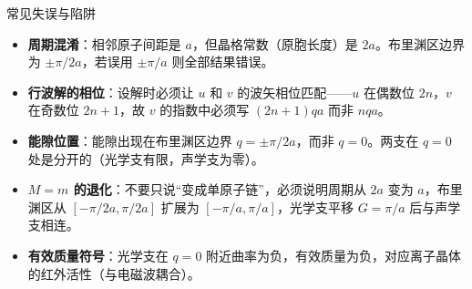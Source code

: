 \begin{errorbox}{常见失误与陷阱}
\begin{itemize}
    \item \textbf{周期混淆}：相邻原子间距是 $a$，但晶格常数（原胞长度）是 $2a$。布里渊区边界为 $\pm\pi/2a$，若误用 $\pm\pi/a$ 则全部结果错误。
    \item \textbf{行波解的相位}：设解时必须让 $u$ 和 $v$ 的波矢相位匹配——$u$ 在偶数位 $2n$，$v$ 在奇数位 $2n+1$，故 $v$ 的指数中必须写 $(2n+1)qa$ 而非 $nqa$。
    \item \textbf{能隙位置}：能隙出现在布里渊区边界 $q=\pm\pi/2a$，而非 $q=0$。两支在 $q=0$ 处是分开的（光学支有限，声学支为零）。
    \item \textbf{$M=m$ 的退化}：不要只说``变成单原子链''，必须说明周期从 $2a$ 变为 $a$，布里渊区从 $[-\pi/2a,\pi/2a]$ 扩展为 $[-\pi/a,\pi/a]$，光学支平移 $G=\pi/a$ 后与声学支相连。
    \item \textbf{有效质量符号}：光学支在 $q=0$ 附近曲率为负，有效质量为负，对应离子晶体的红外活性（与电磁波耦合）。
\end{itemize}
\end{errorbox}

